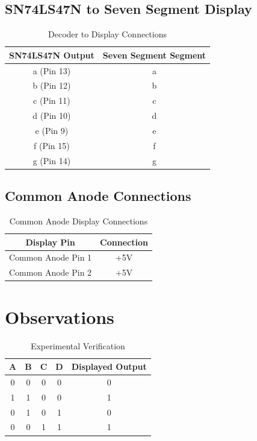 \documentclass[12pt,a4paper]{article}
\begin{document}
\subsection*{SN74LS47N to Seven Segment Display}

\begin{table}[H]
\centering
\caption{Decoder to Display Connections}
\begin{tabular}{|c|c|}
\hline
SN74LS47N Output & Seven Segment Segment \\
\hline
a (Pin 13) & a \\
\hline
b (Pin 12) & b \\
\hline
c (Pin 11) & c \\
\hline
d (Pin 10) & d \\
\hline
e (Pin 9)  & e \\
\hline
f (Pin 15) & f \\
\hline
g (Pin 14) & g \\
\hline
\end{tabular}
\end{table}

\subsection*{Common Anode Connections}

\begin{table}[H]
\centering
\caption{Common Anode Display Connections}
\begin{tabular}{|c|c|}
\hline
Display Pin & Connection \\
\hline
Common Anode Pin 1 & +5V \\
\hline
Common Anode Pin 2 & +5V \\
\hline
\end{tabular}
\end{table}


\section*{Observations}

\begin{table}[H]
\centering
\caption{Experimental Verification}
\begin{tabular}{|c|c|c|c|c|}
\hline
A & B & C & D & Displayed Output \\
\hline
0 & 0 & 0 & 0 & 0 \\
\hline
1 & 1 & 0 & 0 & 1 \\
\hline
0 & 1 & 0 & 1 & 0 \\
\hline
0 & 0 & 1 & 1 & 1 \\
\hline
\end{tabular}
\end{table}
\end{document}
